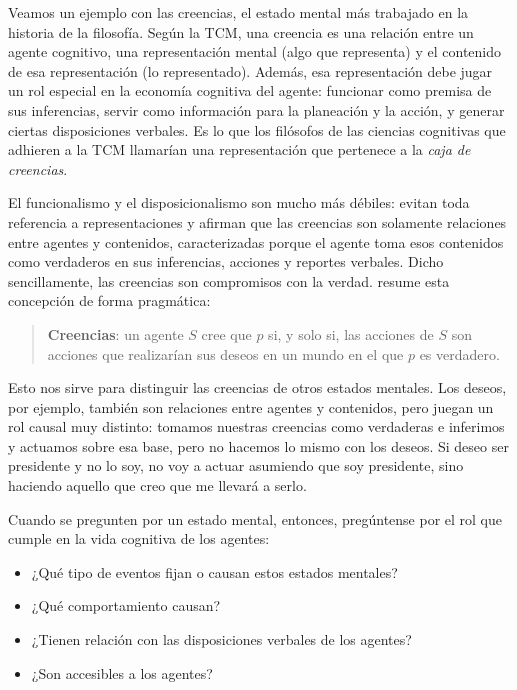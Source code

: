 \documentclass[a4paper,nofonts,justified]{tufte-handout}
\begin{document}
Veamos un ejemplo con las creencias, el estado mental más trabajado en la historia de la filosofía. Según la TCM, una creencia es una relación entre un agente cognitivo, una representación mental (algo que representa) y el contenido de esa representación (lo representado). Además, esa representación debe jugar un rol especial en la economía cognitiva del agente: funcionar como premisa de sus inferencias, servir como información para la planeación y la acción, y generar ciertas disposiciones verbales. Es lo que los filósofos de las ciencias cognitivas que adhieren a la TCM llamarían una representación que pertenece a la \emph{caja de creencias}.

El funcionalismo y el disposicionalismo son mucho más débiles: evitan toda referencia a representaciones y afirman que las creencias son solamente relaciones entre agentes y contenidos, caracterizadas porque el agente toma esos contenidos como verdaderos en sus inferencias, acciones y reportes verbales. Dicho sencillamente, las creencias son compromisos con la verdad. \citet{stalnaker1984} resume esta concepción de forma pragmática:

\begin{quote}
\textbf{Creencias}: un agente $S$ cree que $p$ si, y solo si, las acciones de $S$ son acciones que realizarían sus deseos en un mundo en el que $p$ es verdadero.
\end{quote}

Esto nos sirve para distinguir las creencias de otros estados mentales. Los deseos, por ejemplo, también son relaciones entre agentes y contenidos, pero juegan un rol causal muy distinto: tomamos nuestras creencias como verdaderas e inferimos y actuamos sobre esa base, pero no hacemos lo mismo con los deseos. Si deseo ser presidente y no lo soy, no voy a actuar asumiendo que soy presidente, sino haciendo aquello que creo que me llevará a serlo.

Cuando se pregunten por un estado mental, entonces, pregúntense por el rol que cumple en la vida cognitiva de los agentes:
\begin{itemize}
  \item ¿Qué tipo de eventos fijan o causan estos estados mentales?
  \item ¿Qué comportamiento causan?
  \item ¿Tienen relación con las disposiciones verbales de los agentes?
  \item ¿Son accesibles a los agentes?
\end{itemize}
\end{document}
